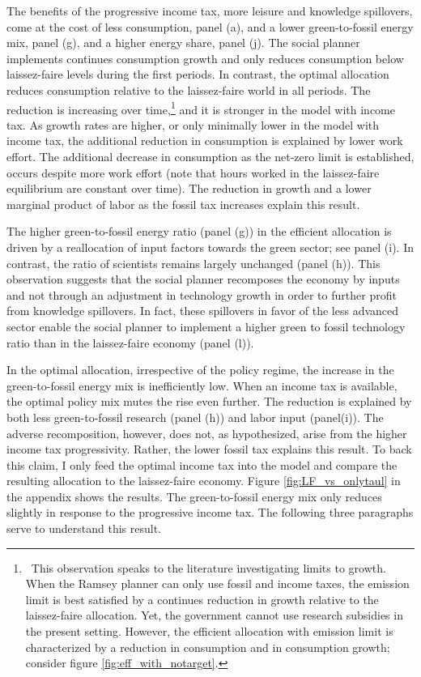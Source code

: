 The benefits of the progressive income tax, more leisure and knowledge spillovers, come at the cost of less consumption, panel (a),  and a lower green-to-fossil energy mix, panel (g), and a higher energy share, panel (j). The social planner implements continues consumption growth and only reduces consumption below laissez-faire levels during the first periods. In contrast, the optimal allocation reduces consumption relative to the laissez-faire world in all periods. The reduction is increasing over time,\footnote{\ This observation speaks to the literature investigating limits to growth. When the Ramsey planner can only use fossil and income taxes, the emission limit is best satisfied by a continues reduction in growth relative to the laissez-faire allocation. Yet, the government cannot use research subsidies in the present setting. However, the efficient allocation with emission limit is characterized by a reduction in consumption and in consumption growth; consider figure \ref{fig:eff_with_notarget}.} and it is stronger in the model with income tax. As growth rates are higher, or only minimally lower in the model with income tax, the additional reduction in consumption is explained by lower work effort. The additional decrease in consumption as the net-zero limit is established, occurs despite more work effort (note that hours worked in the laissez-faire equilibrium are constant over time). The reduction in growth and a lower marginal product of labor as the fossil tax increases explain this result. 

The higher green-to-fossil energy ratio (panel (g)) in the efficient allocation is driven by a reallocation of input factors towards the green sector; see panel (i). In contrast, the ratio of scientists remains largely unchanged (panel (h)). This observation suggests that the social planner recomposes the economy by inputs and not through an adjustment in technology growth in order to further profit from knowledge spillovers. In fact, these spillovers in favor of the less advanced sector enable the social planner to implement a higher green to fossil technology ratio than in the laissez-faire economy (panel (l)). 

In the optimal allocation, irrespective of the policy regime, the increase in the green-to-fossil energy mix is inefficiently low. When an income tax is available, the optimal policy mix mutes the rise even further. The reduction is explained by both less green-to-fossil research (panel (h)) and labor input (panel(i)). 
The adverse recomposition, however, does not, as hypothesized,  arise from the higher income tax progressivity. Rather, the lower fossil tax explains this result. 
To back this claim, I only feed the optimal income tax into the model and compare the resulting allocation to the laissez-faire economy. Figure \ref{fig:LF_vs_onlytaul} in the appendix shows the results. The green-to-fossil energy mix only reduces slightly in response to the progressive income tax. The following three paragraphs serve to understand this result.


